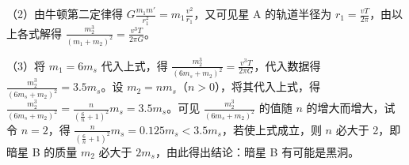 \documentclass[\gkver]{gaokaozhenti}
\begin{document}
\begin{enumerate}
{（2）由牛顿第二定律得 $G\frac{m_{1}m'}{r_{1}^{2}}=m_{1}\frac{v^{2}}{r_{1}}$，又可见星 A 的轨道半径为 $r_{1}=\frac{vT}{2\pi}$，由以上各式解得 $\frac{m_{2}^{3}}{(m_{1}+m_{2})^{2}}=\frac{v^{3}T}{2\pi G}$。

（3）将 $m_{1}=6m_{s}$ 代入上式，得 $\frac{m_{2}^{3}}{(6m_{s}+m_{2})^{2}}=\frac{v^{3}T}{2\pi G}$，代入数据得 $\frac{m_{2}^{3}}{(6m_{s}+m_{2})^{2}}=3.5m_{s}$。设 $m_{2}=nm_{s}$（$n>0$），将其代入上式，得 $\frac{m_{2}^{3}}{(6m_{s}+m_{2})^{2}}=\frac{n}{(\frac{6}{n}+1)^{2}}m_{s}=3.5m_{s}$。可见 $\frac{m_{2}^{3}}{(6m_{s}+m_{2})^{2}}$ 的值随 $n$ 的增大而增大，试令 $n=2$，得 $\frac{n}{(\frac{6}{n}+1)^{2}}m_{s}=0.125m_{s}<3.5m_{s}$，若使上式成立，则 $n$ 必大于 2，即暗星 B 的质量 $m_{2}$ 必大于 $2m_{s}$，由此得出结论：暗星 B 有可能是黑洞。
}

\end{enumerate}
\end{document}
